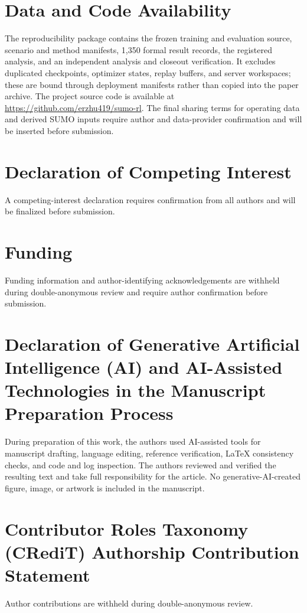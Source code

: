 \section*{Data and Code Availability}

The reproducibility package contains the frozen training and evaluation source,
scenario and method manifests, 1,350 formal result records, the registered
analysis, and an independent analysis and closeout verification. It excludes
duplicated checkpoints, optimizer states, replay buffers, and server
workspaces; these are bound through deployment manifests rather than copied
into the paper archive. The project source code is available at
\url{https://github.com/erzhu419/sumo-rl}. The final sharing terms for operating data and derived
SUMO inputs require author and data-provider confirmation and will be inserted
before submission.

\section*{Declaration of Competing Interest}

A competing-interest declaration requires confirmation from all authors and
will be finalized before submission.

\section*{Funding}

Funding information and author-identifying acknowledgements are withheld during
double-anonymous review and require author confirmation before submission.

\section*{Declaration of Generative Artificial Intelligence (AI) and AI-Assisted Technologies in the Manuscript Preparation Process}

During preparation of this work, the authors used AI-assisted tools for
manuscript drafting, language editing, reference verification, LaTeX
consistency checks, and code and log inspection. The
authors reviewed and verified the resulting text and take full responsibility
for the article. No generative-AI-created figure, image, or artwork is included
in the manuscript.

\section*{Contributor Roles Taxonomy (CRediT) Authorship Contribution Statement}

Author contributions are withheld during double-anonymous review.
